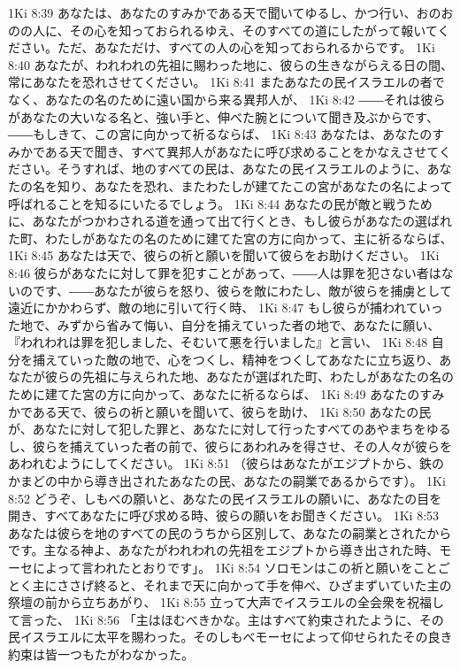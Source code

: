 1Ki 8:39  あなたは、あなたのすみかである天で聞いてゆるし、かつ行い、おのおのの人に、その心を知っておられるゆえ、そのすべての道にしたがって報いてください。ただ、あなただけ、すべての人の心を知っておられるからです。
1Ki 8:40  あなたが、われわれの先祖に賜わった地に、彼らの生きながらえる日の間、常にあなたを恐れさせてください。
1Ki 8:41  またあなたの民イスラエルの者でなく、あなたの名のために遠い国から来る異邦人が、
1Ki 8:42  ――それは彼らがあなたの大いなる名と、強い手と、伸べた腕とについて聞き及ぶからです、――もしきて、この宮に向かって祈るならば、
1Ki 8:43  あなたは、あなたのすみかである天で聞き、すべて異邦人があなたに呼び求めることをかなえさせてください。そうすれば、地のすべての民は、あなたの民イスラエルのように、あなたの名を知り、あなたを恐れ、またわたしが建てたこの宮があなたの名によって呼ばれることを知るにいたるでしょう。
1Ki 8:44  あなたの民が敵と戦うために、あなたがつかわされる道を通って出て行くとき、もし彼らがあなたの選ばれた町、わたしがあなたの名のために建てた宮の方に向かって、主に祈るならば、
1Ki 8:45  あなたは天で、彼らの祈と願いを聞いて彼らをお助けください。
1Ki 8:46  彼らがあなたに対して罪を犯すことがあって、――人は罪を犯さない者はないのです、――あなたが彼らを怒り、彼らを敵にわたし、敵が彼らを捕虜として遠近にかかわらず、敵の地に引いて行く時、
1Ki 8:47  もし彼らが捕われていった地で、みずから省みて悔い、自分を捕えていった者の地で、あなたに願い、『われわれは罪を犯しました、そむいて悪を行いました』と言い、
1Ki 8:48  自分を捕えていった敵の地で、心をつくし、精神をつくしてあなたに立ち返り、あなたが彼らの先祖に与えられた地、あなたが選ばれた町、わたしがあなたの名のために建てた宮の方に向かって、あなたに祈るならば、
1Ki 8:49  あなたのすみかである天で、彼らの祈と願いを聞いて、彼らを助け、
1Ki 8:50  あなたの民が、あなたに対して犯した罪と、あなたに対して行ったすべてのあやまちをゆるし、彼らを捕えていった者の前で、彼らにあわれみを得させ、その人々が彼らをあわれむようにしてください。
1Ki 8:51  （彼らはあなたがエジプトから、鉄のかまどの中から導き出されたあなたの民、あなたの嗣業であるからです）。
1Ki 8:52  どうぞ、しもべの願いと、あなたの民イスラエルの願いに、あなたの目を開き、すべてあなたに呼び求める時、彼らの願いをお聞きください。
1Ki 8:53  あなたは彼らを地のすべての民のうちから区別して、あなたの嗣業とされたからです。主なる神よ、あなたがわれわれの先祖をエジプトから導き出された時、モーセによって言われたとおりです」。
1Ki 8:54  ソロモンはこの祈と願いをことごとく主にささげ終ると、それまで天に向かって手を伸べ、ひざまずいていた主の祭壇の前から立ちあがり、
1Ki 8:55  立って大声でイスラエルの全会衆を祝福して言った、
1Ki 8:56  「主はほむべきかな。主はすべて約束されたように、その民イスラエルに太平を賜わった。そのしもべモーセによって仰せられたその良き約束は皆一つもたがわなかった。
